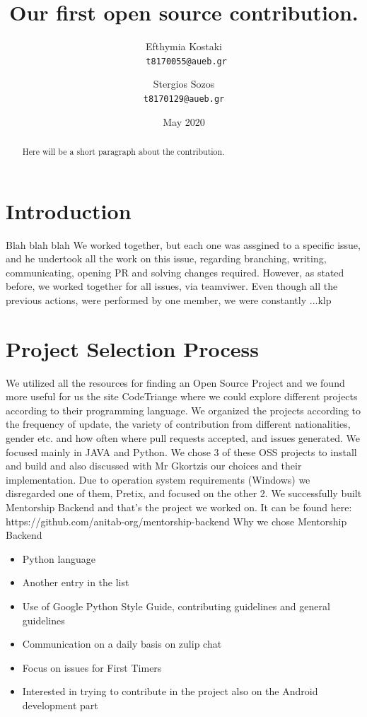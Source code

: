\documentclass{article}
\title{Our first open source contribution.}
\author{Efthymia Kostaki \\
	 \texttt{ t8170055@aueb.gr}
	 \and
	 Stergios Sozos \\
 	 \texttt{t8170129@aueb.gr}
}
\date{May 2020}
\begin{document}
\maketitle

\begin{abstract}
Here will be a short paragraph about the contribution.
\end{abstract}

\section*{Introduction}
Blah blah blah
We worked together, but each one was assgined to a specific issue, and he undertook all the work on this issue, regarding branching, writing, communicating, opening PR and solving changes required. However, as stated before, we worked together for all issues, via teamviwer. Even though all the previous actions, were performed by one member, we were constantly ...klp

\section{Project Selection Process}
We utilized all the resources for finding an Open Source Project and we found more useful for us the site CodeTriange where we could explore different projects according to their programming language.
We organized the projects according to the frequency of update, the variety of contribution from different nationalities, gender etc. and how often where pull requests accepted, and issues generated. We focused mainly in JAVA and Python. 
We chose 3 of these OSS projects to install and build and also discussed with Mr Gkortzis our choices and their implementation. Due to operation system requirements (Windows) we disregarded one of them, Pretix, and focused on the other 2. We successfully built Mentorship Backend and that’s the project we worked on. It can be found here: https://github.com/anitab-org/mentorship-backend
Why we chose Mentorship Backend
\begin{itemize}
  \item Python language 
  \item Another entry in the list
  \item Use of Google Python Style Guide, contributing guidelines and general guidelines
  \item Communication on a daily basis on zulip chat
  \item Focus on issues for First Timers
  \item Interested in trying to contribute in the project also on the Android development part
\end{itemize}
\end{document}
